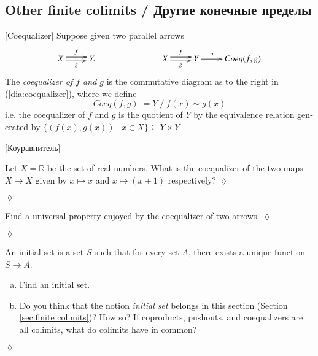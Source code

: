 \documentclass[a4paper]{book}
\def\RR{{\mathbb R}}
\def\to{\rightarrow}
\def\ss{\subseteq}
\def\|{{\;|\;}}
\theoremstyle{myth}
\newtheorem{excENG}[envENG]{\begin{english}Exercise\end{english}}
\newtheorem{definitionENG}[envENG]{\begin{english}Definition\end{english}}
\newenvironment{exerciseENG}{\begin{excENG}}{\hspace*{\fill}$\lozenge$\end{excENG}}
\newtheorem{excRUS}[envRUS]{\begin{russian}Упражнение\end{russian}}
\newtheorem{definitionRUS}[envRUS]{\begin{russian}Определение\end{russian}}
\newenvironment{exerciseRUS}{\begin{excRUS}}{\hspace*{\fill}$\lozenge$\end{excRUS}}
\def\sexc{\begin{enumerate}[a.)]\setlength{\itemsep}{.1cm}\setlength{\parskip}{.1cm}\item}
\def\next{\item}
\def\endsexc{\end{enumerate}}
\begin{document}
\begin{english}

\subsection{Other finite colimits / Другие конечные пределы}

\begin{definitionENG}\label{def:coequalizer}[Coequalizer]
Suppose given two parallel arrows 
\begin{align}\label{dia:coequalizer}
\xymatrix{X\ar@<.5ex>[r]^f\ar@<-.5ex>[r]_g&Y.}\hspace{1in}\xymatrix{X\ar@<.5ex>[r]^f\ar@<-.5ex>[r]_g&Y\ar[r]^-q&Coeq(f,g)}
\end{align}
The {\em coequalizer of $f$ and $g$} is the commutative diagram as to the right in (\ref{dia:coequalizer}), where we define $$Coeq(f,g):=Y\;/\;f(x)\sim g(x)$$ i.e. the coequalizer of $f$ and $g$ is the quotient of $Y$ by the equivalence relation generated by $\{(f(x),g(x))\|x\in X\}\ss Y\times Y$
\end{definitionENG}

\begin{definitionRUS}\label{def:coequalizer}[Коуравнитель]
\begin{russian} \end{russian}
\end{definitionRUS}

\begin{exerciseENG}
Let $X=\RR$ be the set of real numbers. What is the coequalizer of the two maps $X\to X$ given by $x\mapsto x$ and $x\mapsto (x+1)$ respectively?
\end{exerciseENG}

\begin{exerciseRUS}
\begin{russian} \end{russian}
\end{exerciseRUS}

\begin{exerciseENG}
Find a universal property enjoyed by the coequalizer of two arrows.
\end{exerciseENG}

\begin{exerciseRUS}
\begin{russian} \end{russian}
\end{exerciseRUS}

\begin{exerciseENG}[Initial object]\label{exc:initial set}
An initial set is a set $S$ such that for every set $A$, there exists a unique function $S\to A$. 
\sexc Find an initial set. 
\next Do you think that the notion {\em initial set} belongs in this section (Section \ref{sec:finite colimits})? How so? If coproducts, pushouts, and coequalizers are all colimits, what do colimits have in common?
\endsexc
\end{exerciseENG}


\end{english}
\end{document}
